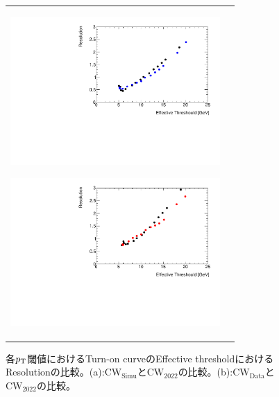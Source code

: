 \begin{figure}
    \begin{tabular}{cc}
    \centering
    \begin{minipage}[b]{0.45\hsize}%
        \centering
        \hspace*{-1.5cm}
        \includegraphics[clip, width=8cm]{fig/4/v05vsv07_Resolution.pdf}
        \subcaption{}
        \label{fig:Resolution_v07v05}
    \end{minipage}%
    \begin{minipage}[b]{0.7\hsize}%
        \centering
        \hspace*{-0.75cm}
        \includegraphics[clip, width=8cm]{fig/4/v05vsv06_Resolution.pdf}
        \subcaption{}
        \label{fig:Resolution_v05v06}
    \end{minipage}%
    \end{tabular}
    \caption{各$p_{\rm{T}}$閾値におけるTurn-on curveのEffective thresholdにおけるResolutionの比較。(a):$\mathrm{CW_{Simu}}$と$\mathrm{CW_{2022}}$の比較。(b):$\mathrm{CW_{Data}}$と$\mathrm{CW_{2022}}$の比較。}
    \label{fig:Resolution_v07v06v05}
\end{figure}

